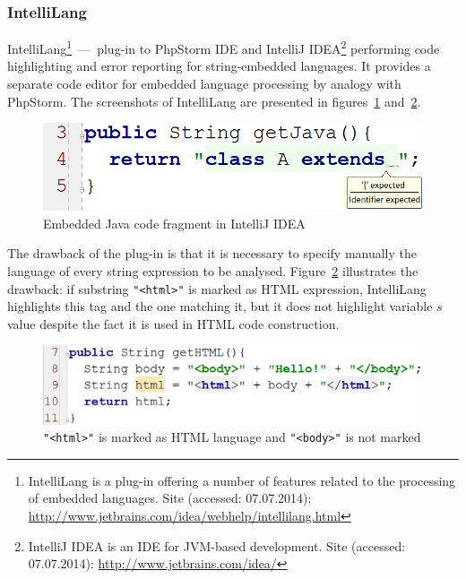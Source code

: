 \documentclass{acm_proc_article-sp}
\begin{document}
\subsubsection{IntelliLang}

IntelliLang\footnote{IntelliLang is a plug-in offering a number of features related to the processing of embedded languages. Site (accessed: 07.07.2014): \url{ http://www.jetbrains.com/idea/webhelp/intellilang.html}}~---~plug-in to PhpStorm IDE and IntelliJ IDEA\footnote{IntelliJ IDEA is an IDE for JVM-based development. Site (accessed: 07.07.2014): \url{http://www.jetbrains.com/idea/}} performing code highlighting and error reporting for string-embedded languages. It provides a separate code editor for embedded language processing by analogy with PhpStorm. The screenshots of IntelliLang are presented in figures~\ref{error_IDEA} and~\ref{IDEA_html}.

\begin{figure}[h!]
    \begin{center}
        \includegraphics[scale=0.3]{graphics/error_IDEA.png}
    \end{center}
    \caption{Embedded Java code fragment in IntelliJ IDEA}
    \label{error_IDEA}
\end{figure} 

The drawback of the plug-in is that it is necessary to specify manually the language of every string expression to be analysed. Figure~\ref{IDEA_html} illustrates the drawback: if substring \verb|"<html>"| is marked as HTML expression, IntelliLang highlights this tag and the one matching it, but it does not highlight variable $s$ value despite the fact it is used in HTML code construction. \newline 

\begin{figure}[h!]
    \begin{center}
        \includegraphics[scale=0.25]{graphics/IDEA_html.png}
    \end{center}
    \caption{\texttt{"<html>"} is marked as HTML language and \texttt{"<body>"} is not marked}
    \label{IDEA_html}
\end{figure} 
\end{document}
